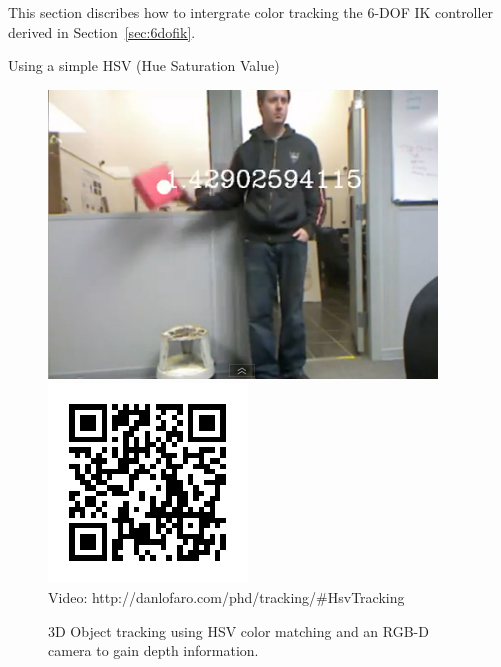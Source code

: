 This section discribes how to intergrate color tracking the 6-DOF IK controller derived in Section~\ref{sec:6dofik}.


Using a simple HSV (Hue Saturation Value) 



\begin{figure}[thpb]
  \centering
      \includegraphics[width=0.69\columnwidth]{./examples/pix/hsv.png}
      \includegraphics[width=0.3\columnwidth]{./qrcode/qrcode-hsvtrackingexample.png}\\
      Video: http://danlofaro.com/phd/tracking/\#HsvTracking
\caption{3D Object tracking using HSV color matching and an RGB-D camera to gain depth information.}
\label{fig:visualservoing}
\end{figure}

